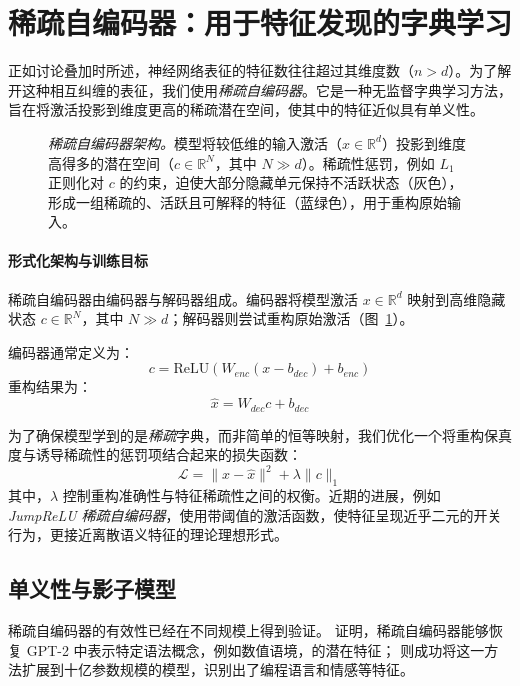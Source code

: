 \section{稀疏自编码器：用于特征发现的字典学习}

正如讨论叠加时所述，神经网络表征的特征数往往超过其维度数（$n > d$）。为了解开这种相互纠缠的表征，我们使用\emph{稀疏自编码器}。它是一种无监督字典学习方法，旨在将激活投影到维度更高的稀疏潜在空间，使其中的特征近似具有单义性。

\begin{figure}[htbp]
    \centering
    
    \caption{\emph{稀疏自编码器架构。}模型将较低维的输入激活（$x \in \mathbb{R}^d$）投影到维度高得多的潜在空间（$c \in \mathbb{R}^N$，其中 $N \gg d$）。稀疏性惩罚，例如 $L_1$ 正则化对 $c$ 的约束，迫使大部分隐藏单元保持不活跃状态（灰色），形成一组稀疏的、活跃且可解释的特征（蓝绿色），用于重构原始输入。\label{fig:sae_architecture}}

\end{figure}

\paragraph{形式化架构与训练目标}
稀疏自编码器由编码器与解码器组成。编码器将模型激活 $x \in \mathbb{R}^d$ 映射到高维隐藏状态 $c \in \mathbb{R}^N$，其中 $N \gg d$；解码器则尝试重构原始激活（图~\ref{fig:sae_architecture}）。

编码器通常定义为：
\begin{equation}
    c = \text{ReLU}(W_{enc}(x - b_{dec}) + b_{enc})
\end{equation}
重构结果为：
\begin{equation}
    \hat{x} = W_{dec} c + b_{dec}
\end{equation}

为了确保模型学到的是\emph{稀疏}字典，而非简单的恒等映射，我们优化一个将重构保真度与诱导稀疏性的惩罚项结合起来的损失函数：
\begin{equation}
    \mathcal{L} = \|x - \hat{x}\|^2 + \lambda \|c\|_1
\end{equation}
其中，$\lambda$ 控制重构准确性与特征稀疏性之间的权衡。近期的进展，例如 \emph{JumpReLU 稀疏自编码器}\citep{rajamanoharan2024jumping}，使用带阈值的激活函数，使特征呈现近乎二元的开关行为，更接近离散语义特征的理论理想形式。


\subsection{单义性与影子模型}
稀疏自编码器的有效性已经在不同规模上得到验证。\citet{cunningham2023sparse} 证明，稀疏自编码器能够恢复 GPT-2 中表示特定语法概念，例如数值语境，的潜在特征；\citet{gao2024scaling} 则成功将这一方法扩展到十亿参数规模的模型，识别出了编程语言和情感等特征。

